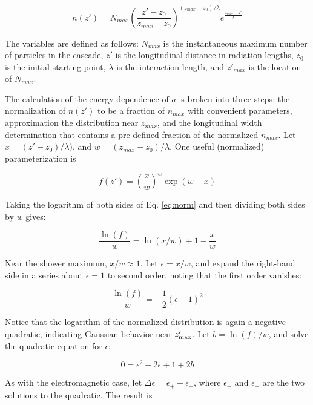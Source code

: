 \documentclass[amsmath,amssymb,aps,prd,10pt,twocolumn]{revtex4}
\begin{document}
\begin{equation}
n(z') = N_{max} \left( \frac{z'-z_{0}}{z_{max} - z_{0}} \right)^{(z_{max} - z_{0})/\lambda} e^{ \frac{z_{max} - z'}{\lambda}}
\end{equation}

The variables are defined as follows: $N_{max}$ is the instantaneous maximum number of particles in the cascade, $z'$ is the longitudinal distance in radiation lengths, $z_0$ is the initial starting point, $\lambda$ is the interaction length, and $z'_{max}$ is the location of $N_{max}$.

The calculation of the energy dependence of $a$ is broken into three steps: the normalization of $n(z')$ to be a fraction of $n_{max}$ with convenient parameters, approximation the distribution near $z_{max}$, and the longitudinal width determination that contains a pre-defined fraction of the normalized $n_{max}$.  Let $x = (z'-z_0)/\lambda)$, and $w = (z_{max} - z_0)/\lambda$.  One useful (normalized) parameterization is

\begin{equation}
f(z') = \left( \frac{x}{w} \right)^{w} \exp(w-x) \label{eq:norm}
\end{equation}

Taking the logarithm of both sides of Eq. \ref{eq:norm} and then dividing both sides by $w$ gives:

\begin{equation}
\frac{\ln(f)}{w} = \ln(x/w) + 1 - \frac{x}{w}
\end{equation}

Near the shower maximum, $x/w \approx 1$.  Let $\epsilon = x/w$, and expand the right-hand side in a series about $\epsilon = 1$ to second order, noting that the first order vanishes:

\begin{equation}
\frac{\ln(f)}{w} = -\frac{1}{2}(\epsilon - 1)^2
\end{equation}

Notice that the logarithm of the normalized distribution is again a negative quadratic, indicating Gaussian behavior near $z'_{\rm max}$.  Let $b = \ln(f)/w$, and solve the quadratic equation for $\epsilon$:

\begin{equation}
0 = \epsilon^2 -2\epsilon + 1 + 2b
\end{equation}

As with the electromagnetic case, let $\Delta \epsilon = \epsilon_{+} - \epsilon_{-}$, where $\epsilon_{+}$ and $\epsilon_{-}$ are the two solutions to the quadratic.  The result is
\end{document}
